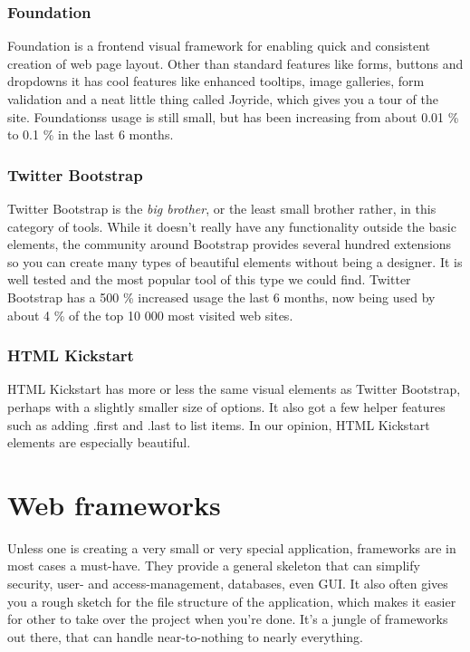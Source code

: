 \documentclass{report}
\begin{document}
\subsubsection{Foundation}
Foundation is a frontend visual framework for enabling quick and consistent creation of web page layout\cite{website:zurb}. Other than standard features like forms, buttons and dropdowns it has cool features like enhanced tooltips, image galleries, form validation and a neat little thing called Joyride, which gives you a tour of the site. Foundationss usage is still small, but has been increasing from about 0.01 \% to 0.1 \% in the last 6 months\cite{website:foundation_usage}.
\subsubsection{Twitter Bootstrap}
Twitter Bootstrap is the \emph{big brother}, or the least small brother rather, in this category of tools. While it doesn't really have any functionality outside the basic elements, the community around Bootstrap provides several hundred extensions so you can create many types of beautiful elements without being a designer. It is well tested and the most popular tool of this type we could find. Twitter Bootstrap has a 500 \%  increased usage the last 6 months, now being used by about 4 \% of the top 10 000 most visited web sites\cite{website:bootstrap_trend}.
\subsubsection{HTML Kickstart}
HTML Kickstart\cite{website:kickstart} has more or less the same visual elements as Twitter Bootstrap, perhaps with a slightly smaller size of options. It also got a few helper features such as adding .first and .last to list items. In our opinion, HTML Kickstart elements are especially beautiful.

\newpage
\section{Web frameworks}
Unless one is creating a very small or very special application, frameworks are in most cases a must-have. They provide a general skeleton that can simplify security, user- and access-management, databases, even GUI. It also often gives you a rough sketch for the file structure of the application, which makes it easier for other to take over the project when you’re done. It’s a jungle of frameworks out there, that can handle near-to-nothing to nearly everything. \\ 
\end{document}
